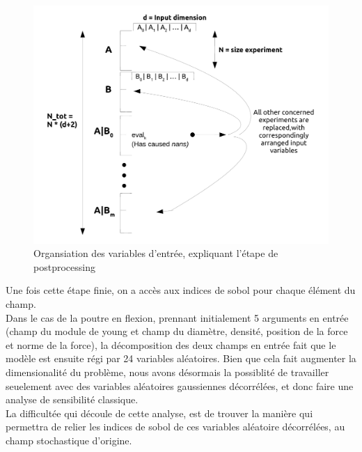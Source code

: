 \documentclass[a4paper,10pt]{article}
\begin{document}
\begin{figure}[H]
   \centering   
   \includegraphics[width=\linewidth]{schema_postprocessing.png}
      \caption{Organsiation des variables d'entrée, expliquant l'étape de postprocessing}
         \label{posprocessing}
\end{figure}


Une fois cette étape finie, on a accès aux indices de sobol pour chaque élément du champ. \\
Dans le cas de la poutre en flexion, prennant initialement 5 arguments en entrée (champ du module de young et champ du diamètre, densité, position de la force et norme de la force), la décomposition des deux champs en entrée fait que le modèle est ensuite régi par 24 variables aléatoires. Bien que cela fait augmenter la dimensionalité du problème, nous avons désormais la possiblité de travailler seuelement avec des variables aléatoires gaussiennes décorrélées, et donc faire une analyse de sensibilité classique.\\
La difficultée qui découle de cette analyse, est de trouver la manière qui permettra de relier les indices de sobol de ces variables aléatoire décorrélées, au champ stochastique d'origine. \\
\end{document}
